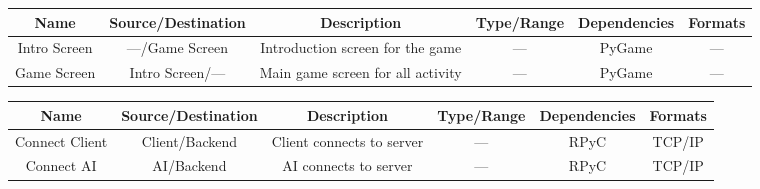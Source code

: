 \documentclass[twoside,letterpaper]{article}
\begin{document}

\begin{minipage}{\linewidth}
\centering
{}
\begin{tabular}{c c c c c c } \toprule[1.5pt]
\bf Name & \bf Source/Destination & \bf Description & \bf Type/Range & \bf Dependencies & \bf Formats\\ \toprule[1.0pt]
Intro Screen & ---/Game Screen & Introduction screen for the game & --- & PyGame & --- \\
Game Screen & Intro Screen/--- & Main game screen for all activity & --- & PyGame & --- \\
\bottomrule[1.5pt]
\end {tabular} %
\end{minipage}

\bigskip

\begin{minipage}{\linewidth}
\centering
{}
\begin{tabular}{c c c c c c } \toprule[1.5pt]
\bf Name & \bf Source/Destination & \bf Description & \bf Type/Range & \bf Dependencies & \bf Formats\\ \toprule[1.0pt]
Connect Client & Client/Backend & Client connects to server & --- & RPyC & TCP/IP\\
Connect AI & AI/Backend & AI connects to server & --- & RPyC & TCP/IP\\
\bottomrule[1.5pt]
\end {tabular}\par
\end{minipage}
\end{document}
